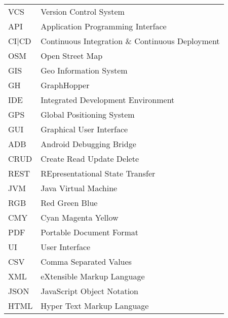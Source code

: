\begin{singlespace}
\begin{flushleft}
\begin{longtable}{p{2 cm}p{14 cm}}
  VCS & Version Control System \\
  API & Application Programming Interface \\
  CI|CD & Continuous Integration \& Continuous Deployment \\
  OSM & Open Street Map \\
  GIS & Geo Information System \\
  GH & GraphHopper \\
  IDE & Integrated Development Environment \\
  GPS & Global Positioning System \\
  GUI & Graphical User Interface \\	
  ADB & Android Debugging Bridge \\
  CRUD & Create Read Update Delete \\
  REST & REpresentational State Transfer \\
  JVM & Java Virtual Machine \\
  RGB & Red Green Blue \\
  CMY & Cyan Magenta Yellow \\
  PDF & Portable Document Format \\
  UI & User Interface \\
  CSV & Comma Separated Values \\
  XML & eXtensible Markup Language \\
  JSON & JavaScript Object Notation \\
  HTML & Hyper Text Markup Language \\
  
\end{longtable}
\end{flushleft}
\end{singlespace}